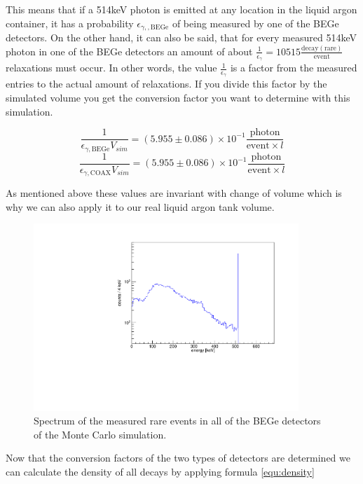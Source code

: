 This means that if a 514keV photon is emitted at any location in the liquid argon container, it has a probability \(\epsilon_{\gamma,\mathrm{,BEGe}}\) of being measured by one of the BEGe detectors.
On the other hand, it can also be said, that for every measured 514keV photon in one of the BEGe detectors an amount of about $\frac{1}{\epsilon_\gamma} = 10515 \frac{\mathrm{decay(rare)}}{\mathrm{event}}$  relaxations must occur.
In other words, the value $\frac{1}{\epsilon_\gamma}$ is a factor from the measured entries to the actual amount of  relaxations.
If you divide this factor by the simulated volume you get the conversion factor you want to determine with this simulation.

\begin{equation*}
\frac{1}{\epsilon_{\gamma\mathrm{,BEGe}} V_{sim}} = (5.955\pm0.086) \times 10^{-1} \frac{\mathrm{photon}}{\mathrm{event} \times l}
\end{equation*}
\begin{equation*}
\frac{1}{\epsilon_{\gamma\mathrm{,COAX}} V_{sim}} = (5.955\pm0.086) \times 10^{-1} \frac{\mathrm{photon}}{\mathrm{event} \times l}
\end{equation*}

As mentioned above these values are invariant with change of volume which is why we can also apply it to our real liquid argon tank volume. 
\\

\begin{figure}[t!]
	\centering
	\ifmakefigures%
	\includegraphics[width=100mm]{./Bilder/MC-514-Phasenraum.pdf}
	\fi%
	\caption{
    Spectrum of the measured rare \Kr events in all of the BEGe detectors of the Monte Carlo simulation.
	}
	\label{fig:PhasenraumMC514}
\end{figure}

Now that the conversion factors of the two types of detectors are determined we can calculate the density of all \Kr decays by applying formula \ref{equ:density}

